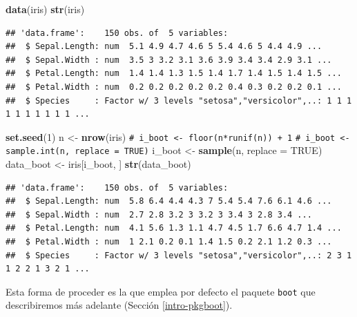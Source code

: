 \documentclass[
]{book}
\newenvironment{Shaded}{\begin{snugshade}}{\end{snugshade}}
\newcommand{\AttributeTok}[1]{\textcolor[rgb]{0.13,0.29,0.53}{#1}}
\newcommand{\CommentTok}[1]{\textcolor[rgb]{0.56,0.35,0.01}{\textit{#1}}}
\newcommand{\ConstantTok}[1]{\textcolor[rgb]{0.56,0.35,0.01}{#1}}
\newcommand{\DecValTok}[1]{\textcolor[rgb]{0.00,0.00,0.81}{#1}}
\newcommand{\FunctionTok}[1]{\textcolor[rgb]{0.13,0.29,0.53}{\textbf{#1}}}
\newcommand{\NormalTok}[1]{#1}
\newcommand{\OtherTok}[1]{\textcolor[rgb]{0.56,0.35,0.01}{#1}}
\theoremstyle{break}
\theoremstyle{nonumberplain}
\renewcommand{\CommentTok}[1]{\textcolor[rgb]{0.41,0.41,0.41}{\texttt{#1}}}
\begin{document}
\begin{Shaded}
\begin{Highlighting}[]
\FunctionTok{data}\NormalTok{(iris)}
\FunctionTok{str}\NormalTok{(iris)}
\end{Highlighting}
\end{Shaded}

\begin{verbatim}
## 'data.frame':    150 obs. of  5 variables:
##  $ Sepal.Length: num  5.1 4.9 4.7 4.6 5 5.4 4.6 5 4.4 4.9 ...
##  $ Sepal.Width : num  3.5 3 3.2 3.1 3.6 3.9 3.4 3.4 2.9 3.1 ...
##  $ Petal.Length: num  1.4 1.4 1.3 1.5 1.4 1.7 1.4 1.5 1.4 1.5 ...
##  $ Petal.Width : num  0.2 0.2 0.2 0.2 0.2 0.4 0.3 0.2 0.2 0.1 ...
##  $ Species     : Factor w/ 3 levels "setosa","versicolor",..: 1 1 1 1 1 1 1 1 1 1 ...
\end{verbatim}

\begin{Shaded}
\begin{Highlighting}[]
\FunctionTok{set.seed}\NormalTok{(}\DecValTok{1}\NormalTok{)}
\NormalTok{n }\OtherTok{\textless{}{-}} \FunctionTok{nrow}\NormalTok{(iris)}
\CommentTok{\# i\_boot \textless{}{-} floor(n*runif(n)) + 1}
\CommentTok{\# i\_boot \textless{}{-} sample.int(n, replace = TRUE)}
\NormalTok{i\_boot }\OtherTok{\textless{}{-}} \FunctionTok{sample}\NormalTok{(n, }\AttributeTok{replace =} \ConstantTok{TRUE}\NormalTok{)}
\NormalTok{data\_boot }\OtherTok{\textless{}{-}}\NormalTok{ iris[i\_boot, ]}
\FunctionTok{str}\NormalTok{(data\_boot)}
\end{Highlighting}
\end{Shaded}

\begin{verbatim}
## 'data.frame':    150 obs. of  5 variables:
##  $ Sepal.Length: num  5.8 6.4 4.4 4.3 7 5.4 5.4 7.6 6.1 4.6 ...
##  $ Sepal.Width : num  2.7 2.8 3.2 3 3.2 3 3.4 3 2.8 3.4 ...
##  $ Petal.Length: num  4.1 5.6 1.3 1.1 4.7 4.5 1.7 6.6 4.7 1.4 ...
##  $ Petal.Width : num  1 2.1 0.2 0.1 1.4 1.5 0.2 2.1 1.2 0.3 ...
##  $ Species     : Factor w/ 3 levels "setosa","versicolor",..: 2 3 1 1 2 2 1 3 2 1 ...
\end{verbatim}

Esta forma de proceder es la que emplea por defecto el paquete \texttt{boot} que
describiremos más adelante (Sección \ref{intro-pkgboot}).
\end{document}
